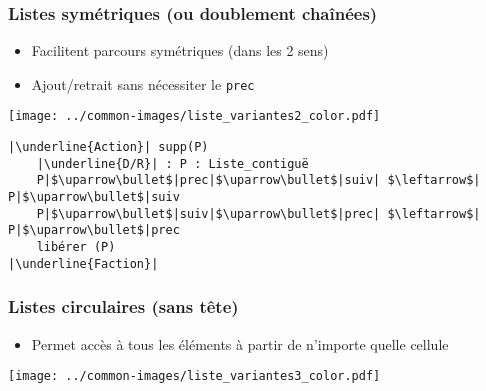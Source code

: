 \documentclass[table,handout,tikz,12pt,svgnames]{beamer}
\begin{document}
\begin{frame}[fragile=singleslide]
	\frametitle{Listes symétriques \large (ou doublement chaînées)}
	\begin{block}{}
		\begin{itemize}
			\item Facilitent parcours symétriques (dans les 2 sens)
			\item Ajout/retrait sans nécessiter le \texttt{prec}
		\end{itemize}
		\vspace{-2em}
		\begin{center}
			{\texttt{[image: ../common-images/liste\_variantes2\_color.pdf]}}
		\end{center}
	\end{block}
	\vspace{-1cm}
	\begin{block}{}
		\begin{verbatim}
|\underline{Action}| supp(P)
	|\underline{D/R}| : P : Liste_contiguë
	P|$\uparrow\bullet$|prec|$\uparrow\bullet$|suiv| $\leftarrow$| P|$\uparrow\bullet$|suiv
	P|$\uparrow\bullet$|suiv|$\uparrow\bullet$|prec| $\leftarrow$| P|$\uparrow\bullet$|prec
	libérer (P)
|\underline{Faction}|
		\end{verbatim}
	\end{block}
\end{frame}


\begin{frame}[fragile=singleslide]
	\frametitle{Listes circulaires (sans tête)}
	\begin{block}{}
		\begin{itemize}
			\item Permet accès à tous les éléments à partir de n'importe quelle cellule
		\end{itemize}
	\end{block}
	\begin{center}
		\hspace{-1.5cm}
		{\texttt{[image: ../common-images/liste\_variantes3\_color.pdf]}}
	\end{center}
\end{frame}
\end{document}

